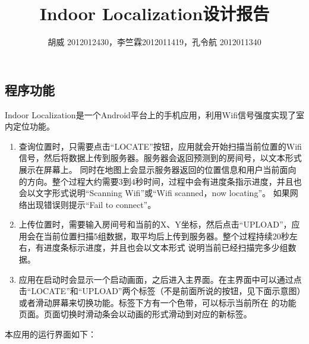 \documentclass[a4paper,10pt]{article}
\begin{document}
\begin{CJK*}{UTF8}{gbsn}
\CJKtilde
\title{Indoor Localization设计报告}
\author{胡威 2012012430，李竺霖2012011419，孔令航 2012011340}
\date{}
\maketitle

\section{程序功能}
Indoor Localization是一个Android平台上的手机应用，利用Wifi信号强度实现了室内定位功能。

\begin{enumerate}
 \item 查询位置时，只需要点击“LOCATE”按钮，应用就会开始扫描当前位置的Wifi信号，然后将数据上传到服务器。服务器会返回预测到的房间号，以文本形式展示在屏幕上。
 同时在地图上会显示服务器返回的位置信息和用户当前面向的方向。整个过程大约需要3到4秒时间，过程中会有进度条指示进度，并且也会以文字形式说明“Scanning Wifi”或“Wifi scanned，now locating”。
 如果网络出现错误则提示“Fail to connect”。
 \item 上传位置时，需要输入房间号和当前的X、Y坐标，然后点击“UPLOAD”，应用会在当前位置扫描5组数据，取平均后上传到服务器。整个过程持续20秒左右，有进度条标示进度，并且也会以文本形式
 说明当前已经扫描完多少组数据。
 \item 应用在启动时会显示一个启动画面，之后进入主界面。在主界面中可以通过点击“LOCATE”和“UPLOAD”两个标签（不是前面所说的按钮，见下面示意图）或者滑动屏幕来切换功能。标签下方有一个色带，可以标示当前所在
 的功能页面。页面切换时滑动条会以动画的形式滑动到对应的新标签。
\end{enumerate}

本应用的运行界面如下：


\end{CJK*}
\end{document}
